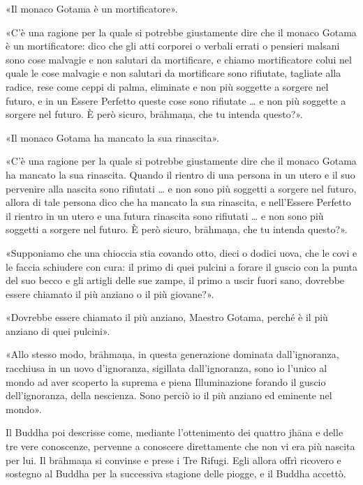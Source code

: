 «Il monaco Gotama è un mortificatore».


«C’è una ragione per la quale si potrebbe giustamente dire che il monaco
Gotama è un mortificatore: dico che gli atti corporei o verbali errati o
pensieri malsani sono cose malvagie e non salutari da mortificare, e
chiamo mortificatore colui nel quale le cose malvagie e non salutari da
mortificare sono rifiutate, tagliate alla radice, rese come ceppi di
palma, eliminate e non più soggette a sorgere nel futuro, e in un Essere
Perfetto queste cose sono rifiutate … e non più soggette a sorgere nel
futuro. È però sicuro, brāhmaṇa, che tu intenda questo?».


«Il monaco Gotama ha mancato la sua rinascita».


«C’è una ragione per la quale si potrebbe giustamente dire che il monaco
Gotama ha mancato la sua rinascita. Quando il rientro di una persona in
un utero e il suo pervenire alla nascita sono rifiutati … e non sono più
soggetti a sorgere nel futuro, allora di tale persona dico che ha
mancato la sua rinascita, e nell’Essere Perfetto il rientro in un utero
e una futura rinascita sono rifiutati … e non sono più soggetti a
sorgere nel futuro. È però sicuro, brāhmaṇa, che tu intenda questo?».


«Supponiamo che una chioccia stia covando otto, dieci o dodici uova, che
le covi e le faccia schiudere con cura: il primo di quei pulcini a
forare il guscio con la punta del suo becco e gli artigli delle sue
zampe, il primo a uscir fuori sano, dovrebbe essere chiamato il più
anziano o il più giovane?».


«Dovrebbe essere chiamato il più anziano, Maestro Gotama, perché è il
più anziano di quei pulcini».


«Allo stesso modo, brāhmaṇa, in questa generazione dominata
dall’ignoranza, racchiusa in un uovo d’ignoranza, sigillata
dall’ignoranza, sono io l’unico al mondo ad aver scoperto la suprema e
piena Illuminazione forando il guscio dell’ignoranza, della nescienza.
Sono perciò io il più anziano ed eminente nel mondo».




 Il Buddha poi descrisse come, mediante l’ottenimento
dei quattro jhāna e delle tre vere conoscenze, pervenne a conoscere
direttamente che non vi era più nascita per lui. Il brāhmaṇa si convinse
e prese i Tre Rifugi. Egli allora offrì ricovero e sostegno al Buddha
per la successiva stagione delle piogge, e il Buddha accettò.


